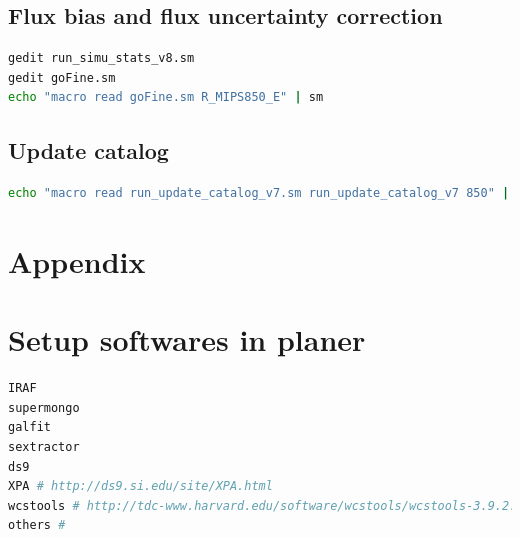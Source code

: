 \documentclass[11pt,a4paper]{article}
\begin{document}
\subsection{Flux bias and flux uncertainty correction}
\label{Band850_dfcorr}

\begin{lstlisting}[language=bash]
gedit run_simu_stats_v8.sm
gedit goFine.sm
echo "macro read goFine.sm R_MIPS850_E" | sm
\end{lstlisting}


\subsection{Update catalog}

\begin{lstlisting}[language=bash]
echo "macro read run_update_catalog_v7.sm run_update_catalog_v7 850" | sm
\end{lstlisting}



\clearpage

\appendix
\section{Appendix}
\label{Appendix}


\clearpage


\section{Setup softwares in planer}
\label{Appendix_Software_Dependencies}

\begin{lstlisting}[language=bash]
IRAF
supermongo
galfit
sextractor
ds9
XPA # http://ds9.si.edu/site/XPA.html
wcstools # http://tdc-www.harvard.edu/software/wcstools/wcstools-3.9.2.tar.gz
others # 
\end{lstlisting}

\end{document}
